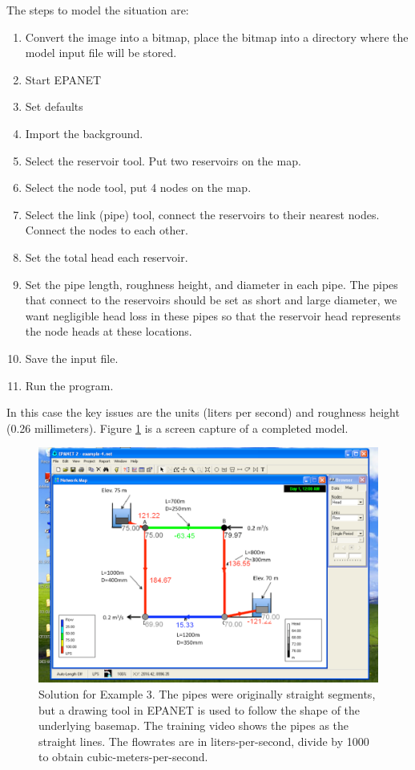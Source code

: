 The steps to model the situation are:
\begin{enumerate}
\item Convert the image into a bitmap, place the bitmap into a directory where the model input file will be stored.
\item Start EPANET
\item Set defaults
\item Import the background.
\item Select the reservoir tool.  Put two reservoirs on the map.
\item Select the node tool, put 4 nodes on the map.
\item Select the link (pipe) tool, connect the reservoirs to their nearest nodes.  Connect the nodes to each other.  
\item Set the total head each reservoir.
\item Set the pipe length, roughness height, and diameter in each pipe.  The pipes that connect to the reservoirs should be set as short and large diameter, we want negligible head loss in these pipes so that the reservoir head represents the node heads at these locations.
\item Save the input file.
\item Run the program.   
\end{enumerate}

In this case the key issues are the units (liters per second) and roughness height (0.26 millimeters).   Figure \ref{fig:simple-network} is a screen capture of a completed model.   

\begin{figure}[htbp] %
   \centering
   \includegraphics[width=6in]{simple-network.pdf} 
   \caption{Solution for Example 3.  The pipes were originally straight segments, but a drawing tool in EPANET is used to follow the shape of the underlying basemap.   The training video shows the pipes as the straight lines.  The flowrates are in liters-per-second, divide by 1000 to obtain cubic-meters-per-second.}
   \label{fig:simple-network}
\end{figure}



